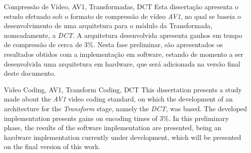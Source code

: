 \TitlePage
  \vspace*{55mm}
       {Compressão de Vídeo, AV1, Transformadas, DCT}
       {Esta dissertação apresenta o estudo efetuado sob o formato de compressão de vídeo \emph{AV1}, no qual se baseia o desenvolvimento de uma arquitetura para o módulo da Transformada, nomeadamente, a \emph{DCT}. A arquitetura desenvolvida apresenta ganhos em tempo de compressão de cerca de $3\%$.}
  \TEXT{}
       {Nesta fase preliminar, são apresentados os resultados obtidos com a implementação em software, estando de momento a ser desenvolvida uma arquitetura em hardware, que será adicionada na versão final deste documento.}
\EndTitlePage
\titlepage\ \endtitlepage %

\TitlePage
  \vspace*{55mm}
       {Video Coding, AV1, Transform Coding, DCT}
       {This dissertation presents a study made about the \emph{AV1} video coding standard, on which the development of an architecture for the \emph{Transform} stage, namely the \emph{DCT}, was based. The developed implementation presents gains on encoding times of $3\%$.}
  \TEXT{}
       {In this preliminary phase, the results of the software implementation are presented, being an hardware implementation currently under development, which will be presented on the final version of this work.}
\EndTitlePage
\titlepage\ \endtitlepage %
